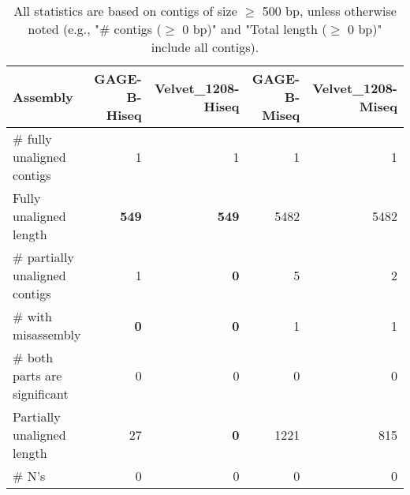 \documentclass[12pt,a4paper]{article}
\begin{document}
\begin{table}[ht]
\begin{center}
\caption{All statistics are based on contigs of size $\geq$ 500 bp, unless otherwise noted (e.g., "\# contigs ($\geq$ 0 bp)" and "Total length ($\geq$ 0 bp)" include all contigs).}
\begin{tabular}{|l*{4}{|r}|}
\hline
Assembly & GAGE-B-Hiseq & Velvet\_1208-Hiseq & GAGE-B-Miseq & Velvet\_1208-Miseq \\ \hline
\# fully unaligned contigs & 1 & 1 & 1 & 1 \\ \hline
Fully unaligned length & {\bf 549} & {\bf 549} & 5482 & 5482 \\ \hline
\# partially unaligned contigs & 1 & {\bf 0} & 5 & 2 \\ \hline
\hspace{5mm}\# with misassembly & {\bf 0} & {\bf 0} & 1 & 1 \\ \hline
\hspace{5mm}\# both parts are significant & 0 & 0 & 0 & 0 \\ \hline
Partially unaligned length & 27 & {\bf 0} & 1221 & 815 \\ \hline
\# N's & 0 & 0 & 0 & 0 \\ \hline
\end{tabular}
\end{center}
\end{table}
\end{document}
